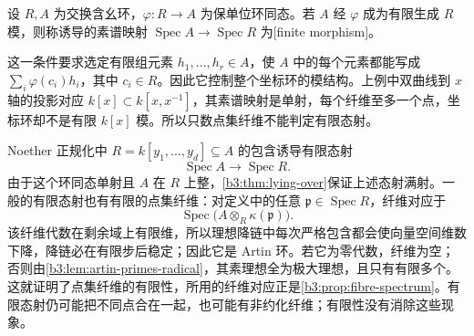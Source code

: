 \begin{definition}\label{b3:def:finite-affine-map}
	设 \(R,A\) 为交换含幺环，\(\varphi:R\to A\) 为保单位环同态。若 \(A\) 经 \(\varphi\) 成为有限生成 \(R\) 模，则称诱导的素谱映射 \(\operatorname{Spec}A\to\operatorname{Spec}R\) 为[finite morphism]。
\end{definition}

这一条件要求选定有限组元素 \(h_1,\ldots,h_r\in A\)，使 \(A\) 中的每个元素都能写成 \(\sum_i\varphi(c_i)h_i\)，其中 \(c_i\in R\)。因此它控制整个坐标环的模结构。上例中双曲线到 \(x\) 轴的投影对应 \(k[x]\subset k[x,x^{-1}]\)，其素谱映射是单射，每个纤维至多一个点，坐标环却不是有限 \(k[x]\) 模。所以只数点集纤维不能判定有限态射。

\ProseParagraphBreak
Noether 正规化中 \(R=k[y_1,\ldots,y_d]\subseteq A\) 的包含诱导有限态射
\[
	\operatorname{Spec}A\longrightarrow\operatorname{Spec}R.
\]
由于这个环同态单射且 \(A\) 在 \(R\) 上整，\cref{b3:thm:lying-over}保证上述态射满射。一般的有限态射也有有限的点集纤维：对定义中的任意 \(\mathfrak p\in\operatorname{Spec}R\)，纤维对应于
\[
	\operatorname{Spec}\bigl(A\otimes_R\kappa(\mathfrak p)\bigr).
\]
该纤维代数在剩余域上有限维，所以理想降链中每次严格包含都会使向量空间维数下降，降链必在有限步后稳定；因此它是 Artin 环。若它为零代数，纤维为空；否则由\cref{b3:lem:artin-primes-radical}，其素理想全为极大理想，且只有有限多个。这就证明了点集纤维的有限性，所用的纤维对应正是\cref{b3:prop:fibre-spectrum}。有限态射仍可能把不同点合在一起，也可能有非约化纤维；有限性没有消除这些现象。
